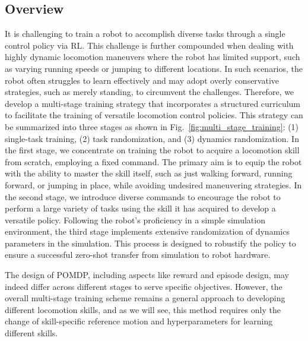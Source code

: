 \subsection{Overview}
It is challenging to train a robot to accomplish diverse tasks through a single control policy via RL. 
This challenge is further compounded when dealing with highly dynamic locomotion maneuvers where the robot has limited support, such as varying running speeds or jumping to different locations. 
In such scenarios, the robot often struggles to learn effectively and may adopt overly conservative strategies, such as merely standing, to circumvent the challenges.
Therefore, we develop a multi-stage training strategy that incorporates a structured curriculum to facilitate the training of versatile locomotion control policies. 
This strategy can be summarized into three stages as shown in Fig.~\ref{fig:multi_stage_training}: (1) single-task training, (2) task randomization, and (3) dynamics randomization.
In the first stage, we concentrate on training the robot to acquire a locomotion skill from scratch, employing a fixed command. 
The primary aim is to equip the robot with the ability to master the skill itself, such as just walking forward, running forward, or jumping in place, while avoiding undesired maneuvering strategies.
In the second stage, we introduce diverse commands to encourage the robot to perform a large variety of tasks using the skill it has acquired to develop a versatile policy.
Following the robot's proficiency in a simple simulation environment, the third stage implements extensive randomization of dynamics parameters in the simulation. 
This process is designed to robustify the policy to ensure a successful zero-shot transfer from simulation to robot hardware.

The design of POMDP, including aspects like reward and episode design, may indeed differ across different stages to serve specific objectives. 
However, the overall multi-stage training scheme remains a general approach to developing different locomotion skills, and as we will see, this method requires only the change of skill-specific reference motion and hyperparameters for learning different skills. 


